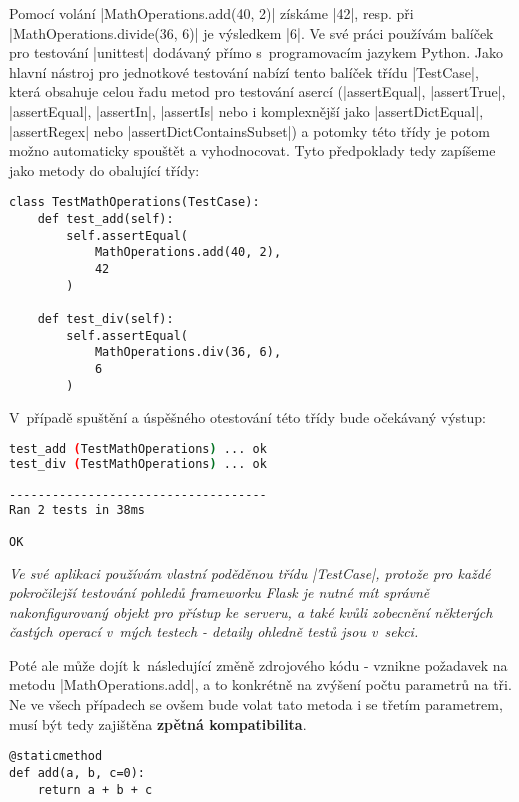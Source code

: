 \begin{sloppypar}
	Pomocí volání \ic|MathOperations.add(40, 2)| získáme \ic|42|, resp. při \ic|MathOperations.divide(36, 6)| je výsledkem \ic|6|. Ve své práci používám balíček pro testování \ic|unittest| dodávaný přímo s~programovacím jazykem Python. Jako hlavní nástroj pro jednotkové testování nabízí tento balíček třídu \ic|TestCase|, která obsahuje celou řadu metod pro testování asercí (\ic|assertEqual|, \ic|assertTrue|, \ic|assertEqual|, \ic|assertIn|, \ic|assertIs| nebo i komplexnější jako \ic|assertDictEqual|, \ic|assertRegex| nebo \ic|assertDictContainsSubset|) a potomky této třídy je potom možno automaticky spouštět a vyhodnocovat. Tyto předpoklady tedy zapíšeme jako metody do obalující třídy:
\end{sloppypar}

\begin{lstlisting}[caption={Základní TestCase pro třídu $MathOperations$}]
class TestMathOperations(TestCase):
	def test_add(self):
		self.assertEqual(
			MathOperations.add(40, 2),
			42
		)

	def test_div(self):
		self.assertEqual(
			MathOperations.div(36, 6),
			6
		)
\end{lstlisting}

V~případě spuštění a úspěšného otestování této třídy bude očekávaný výstup:
\begin{lstlisting}[language=bash, caption={Ukázka výstupu ze spuštění testů}]
test_add (TestMathOperations) ... ok
test_div (TestMathOperations) ... ok

------------------------------------
Ran 2 tests in 38ms

OK
\end{lstlisting}


{\itshape
	Ve své aplikaci používám vlastní poděděnou třídu \ic|TestCase|, protože pro každé pokročilejší testování pohledů frameworku Flask je nutné mít správně nakonfigurovaný objekt pro  přístup ke serveru, a také kvůli zobecnění některých častých operací v~mých testech - detaily ohledně testů jsou v~sekci.
}


Poté ale může dojít k~následující změně zdrojového k\'{o}du - vznikne požadavek na metodu \ic|MathOperations.add|, a to konkrétně na zvýšení počtu parametrů na tři. Ne ve všech případech se ovšem bude volat tato metoda i se třetím parametrem, musí být tedy zajištěna \textbf{zpětná kompatibilita}.

\begin{lstlisting}[caption={Vylepšená implementace metoda $MathOperations.add$}]
@staticmethod
def add(a, b, c=0):
	return a + b + c
\end{lstlisting}

